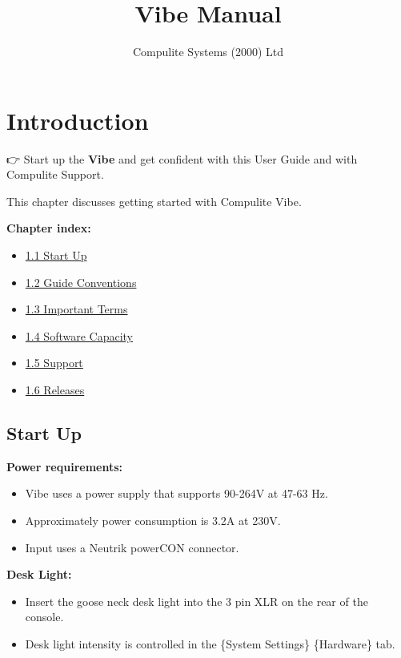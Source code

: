 \documentclass[
]{article}
\title{Vibe Manual}
\author{Compulite Systems (2000) Ltd}
\date{}
\providecommand{\tightlist}{%
  \setlength{\itemsep}{0pt}\setlength{\parskip}{0pt}}
\begin{document}
\maketitle

{
\setcounter{tocdepth}{2}
\tableofcontents
}
\hypertarget{introduction}{%
\section{Introduction}\label{introduction}}

👉 Start up the \textbf{Vibe} and get confident with this User Guide and with Compulite Support.

This chapter discusses getting started with Compulite Vibe.

\textbf{Chapter index:}

\begin{itemize}
\tightlist
\item
  \protect\hyperlink{Start-Up-1.1}{1.1 Start Up}
\item
  \protect\hyperlink{Guide-Conventions-1.2}{1.2 Guide Conventions}
\item
  \protect\hyperlink{Important-Terms-1.3}{1.3 Important Terms}
\item
  \protect\hyperlink{Software-Capacity-1.4}{1.4 Software Capacity}
\item
  \protect\hyperlink{Support-1.5}{1.5 Support}
\item
  \protect\hyperlink{Releases-1.6}{1.6 Releases}
\end{itemize}

\hypertarget{Start-Up-1.1}{%
\subsection{Start Up}\label{Start-Up-1.1}}

\textbf{Power requirements:}

\begin{itemize}
\tightlist
\item
  Vibe uses a power supply that supports 90-264V at 47-63 Hz.
\item
  Approximately power consumption is 3.2A at 230V.
\item
  Input uses a Neutrik powerCON connector.
\end{itemize}

\textbf{Desk Light:}

\begin{itemize}
\tightlist
\item
  Insert the goose neck desk light into the 3 pin XLR on the rear of the console.
\item
  Desk light intensity is controlled in the \{System Settings\} \{Hardware\} tab.
\end{itemize}
\end{document}
